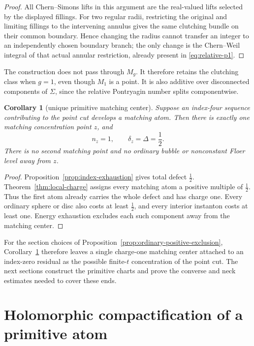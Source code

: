 \documentclass[11pt]{amsart}
\newtheorem{corollary}[theorem]{Corollary}
\theoremstyle{definition}
\theoremstyle{remark}
\theoremstyle{plain}
\begin{document}
\begin{proof}
All Chern--Simons lifts in this argument are the real-valued lifts selected
by the displayed fillings.  For two regular radii, restricting the original
and limiting fillings to the intervening annulus gives the same clutching
bundle on their common boundary.  Hence changing the radius cannot transfer
an integer to an independently chosen boundary branch; the only change is
the Chern--Weil integral of that actual annular restriction, already present
in \eqref{eq:relative-p1}.
\end{proof}

The construction does not pass through $M_g$.  It therefore retains the
clutching class when $g=1$, even though $M_1$ is a point.  It is also
additive over disconnected components of $\Sigma$, since the relative
Pontryagin number splits componentwise.

\begin{corollary}[unique primitive matching center]\label{cor:primitive-atom}
Suppose an index-four sequence contributing to the point cut develops a
matching atom.  Then there is exactly one matching concentration point
$z$, and
\begin{equation}\label{eq:primitive-charge}
                 n_z=1,\qquad \delta_z=\Delta=\frac12.
\end{equation}
There is no second matching point and no ordinary bubble or nonconstant
Floer level away from $z$.
\end{corollary}

\begin{proof}
Proposition~\ref{prop:index-exhaustion} gives total defect $\frac12$.
Theorem~\ref{thm:local-charge} assigns every matching atom a positive
multiple of $\frac12$.  Thus the first atom already carries the whole
defect and has charge one.  Every ordinary sphere or disc also costs at
least $\frac12$, and every interior instanton costs at least one.  Energy
exhaustion excludes each such component away from the matching center.
\end{proof}

For the section choices of
Proposition~\ref{prop:ordinary-positive-exclusion},
Corollary~\ref{cor:primitive-atom} therefore leaves a
single charge-one matching center attached to an
index-zero residual as the possible finite-$t$
concentration of the point cut. The next sections
construct the primitive charts and prove the
converse and neck estimates needed to cover
these ends.

\section{Holomorphic compactification of a primitive atom}
\label{sec:stable-reduction}
\end{document}
